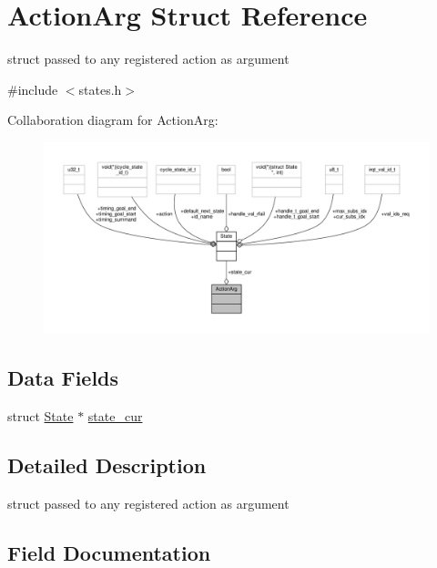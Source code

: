\hypertarget{struct_action_arg}{}\section{Action\+Arg Struct Reference}
\label{struct_action_arg}


struct passed to any registered action as argument  




{\ttfamily \#include $<$states.\+h$>$}



Collaboration diagram for Action\+Arg\+:\nopagebreak
\begin{figure}[H]
\begin{center}
\leavevmode
\includegraphics[width=350pt]{struct_action_arg__coll__graph}
\end{center}
\end{figure}
\subsection*{Data Fields}
\begin{DoxyCompactItemize}
\item 
struct \hyperlink{struct_state}{State} $\ast$ \hyperlink{struct_action_arg_a2f7d37145be4a5d1c22f700f31ae2c27}{state\+\_\+cur}
\end{DoxyCompactItemize}


\subsection{Detailed Description}
struct passed to any registered action as argument 

\subsection{Field Documentation}
